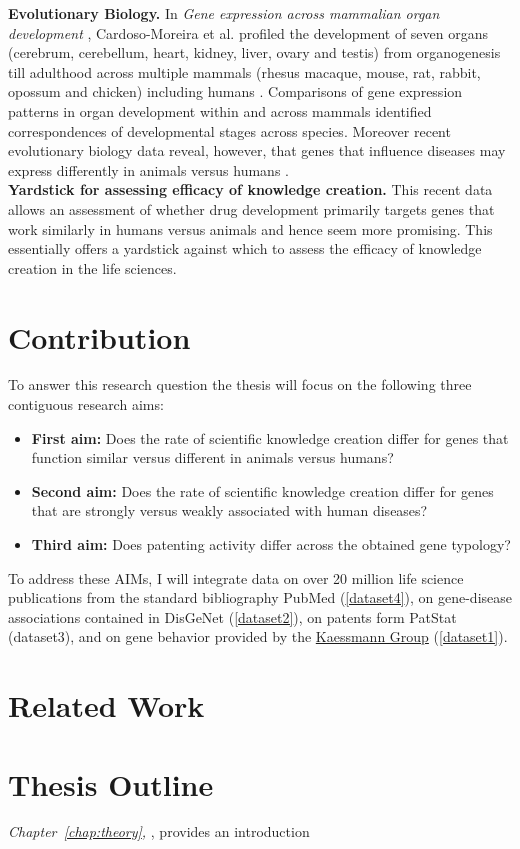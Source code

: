 \textbf{Evolutionary Biology.} In \textit{Gene expression across mammalian organ development} \cite{CardosoMoreira2019GeneEA}, Cardoso-Moreira et al. profiled the development of seven organs (cerebrum, cerebellum, heart, kidney, liver, ovary and testis) from organogenesis till adulthood across multiple mammals (rhesus macaque, mouse, rat, rabbit, opossum and chicken) including humans \cite{CardosoMoreira2019GeneEA}. Comparisons of gene expression patterns in organ development within and across mammals identified correspondences of developmental stages across species. Moreover recent evolutionary biology data reveal, however, that genes that influence diseases may express differently in animals versus humans \cite{CardosoMoreira2019GeneEA}. \\

\textbf{Yardstick for assessing efficacy of knowledge creation.} This recent data allows an assessment of whether drug development primarily targets genes that work similarly in humans versus animals and hence seem more promising. This essentially offers a yardstick against which to assess the efficacy of knowledge creation in the life sciences.

\section{Contribution}

To answer this research question the thesis will focus on the following three contiguous research aims:
\begin{itemize}
	\item \textbf{First aim:} Does the rate of scientific knowledge creation differ for genes that function similar versus different in animals versus humans?
	\item \textbf{Second aim:} Does the rate of scientific knowledge creation differ for genes that are strongly versus weakly associated with human diseases?
	\item \textbf{Third aim:} Does patenting activity differ across the obtained gene typology?
\end{itemize}

To address these AIMs, I will integrate data on over 20 million life science publications from the standard bibliography PubMed (\ref{dataset4}), on gene-disease associations contained in DisGeNet (\ref{dataset2}), on patents form PatStat (dataset3), and on gene behavior provided by the \href{https://www.zmbh.uni-heidelberg.de/kaessmann/}{Kaessmann Group} (\ref{dataset1}).

\section{Related Work}

\section{Thesis Outline}
\textit{Chapter~\ref{chap:theory}, }, provides an introduction